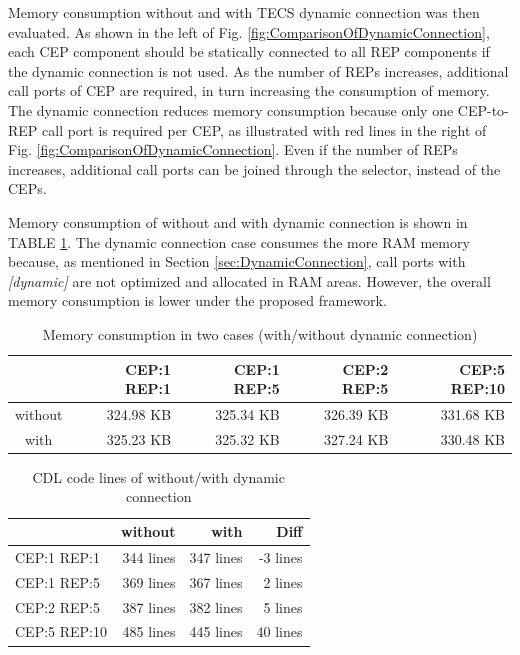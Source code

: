 \documentclass[a4j,12pt,oneside,openany,english]{jsbook}
\begin{document}
Memory consumption without and with TECS dynamic connection was then evaluated.
As shown in the left of Fig. \ref{fig:ComparisonOfDynamicConnection}, each CEP component should be statically connected to all REP components if the dynamic connection is not used.
As the number of REPs increases, additional call ports of CEP are required, in turn increasing the consumption of memory. 
The dynamic connection reduces memory consumption because only one CEP-to-REP call port is required per CEP, as illustrated with red lines in the right of Fig. \ref{fig:ComparisonOfDynamicConnection}.
Even if the number of REPs increases, additional call ports can be joined through the selector, instead of the CEPs.

Memory consumption of without and with dynamic connection is shown in TABLE \ref{fig:EvaluationOfDynamicConnection}.
The dynamic connection case consumes the more RAM memory because, as mentioned in Section \ref{sec:DynamicConnection}, call ports with {\it [dynamic]} are not optimized and allocated in RAM areas.
However, the overall memory consumption is lower under the proposed framework.

\begin{table}[t]
    \centering
    \caption{Memory consumption in two cases (with/without dynamic connection)}
    \begin{tabular}{c|r|r|r|r}
        \hline\hline
                &  CEP:1 REP:1 & CEP:1 REP:5 & CEP:2 REP:5 & CEP:5 REP:10 \\ \hline
        without &  324.98 KB   & 325.34 KB   & 326.39 KB   & 331.68 KB   \\
        with    &  325.23 KB   & 325.32 KB   & 327.24 KB   & 330.48 KB   \\
        \hline
    \end{tabular}
    \label{fig:EvaluationOfDynamicConnection}
\end{table}

\begin{table}[t]
    \centering
    \caption{CDL code lines of without/with dynamic connection}
    \begin{tabular}{l|r|r|r}
        \hline\hline
                     &  without  &  with  &  Diff  \\ \hline
        CEP:1 REP:1  &  344 lines     &  347 lines  &  -3 lines   \\
        CEP:1 REP:5  &  369 lines     &  367 lines  &   2 lines   \\
        CEP:2 REP:5  &  387 lines     &  382 lines  &   5 lines   \\
        CEP:5 REP:10 &  485 lines     &  445 lines  &  40 lines   \\
        \hline
    \end{tabular}
    \label{tab:EvaluationOfConfigurabilityByDynamicConnection}
\end{table}
\end{document}
